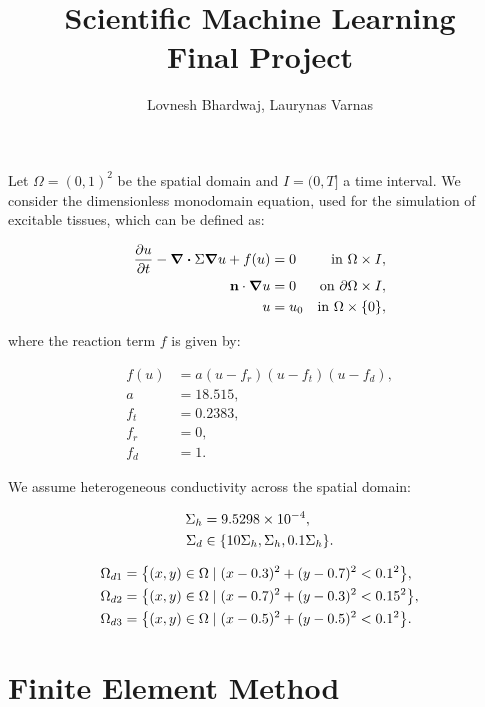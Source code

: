 \documentclass[unicode,11pt,a4paper,oneside,numbers=endperiod,openany]{article}
\title{Scientific Machine Learning \\ Final Project}
\author{Lovnesh Bhardwaj, Laurynas Varnas}
\date{}
\begin{document}
\maketitle

\noindent
Let $\Omega = (0, 1)^2$ be the spatial domain and $I = (0, T]$ a time interval.
We consider the dimensionless monodomain equation, used for the simulation of
excitable tissues, which can be defined as:

\begin{align*}
	\pdv{u}{t} - \divergence \Sigma \grad u + f(u) & = 0   & \text{in } \Omega \times I,          \\
	\mathbf{n} \cdot \grad u                       & = 0   & \text{on } \partial \Omega \times I, \\
	u                                              & = u_0 & \text{in } \Omega \times \{0\},
\end{align*}

where the reaction term $f$ is given by:

\begin{align*}
	f(u) & = a(u - f_r)(u - f_t)(u - f_d), \\
	a    & = 18.515,                       \\
	f_t  & = 0.2383,                       \\
	f_r  & = 0,                            \\
	f_d  & = 1.
\end{align*}

We assume heterogeneous conductivity across the spatial domain:

\begin{align*}
	\Sigma_h & = 9.5298 \times 10^{-4},                       \\
	\Sigma_d & \in \qty{ 10\Sigma_h, \Sigma_h, 0.1\Sigma_h }.
\end{align*}

\begin{align*}
	\Omega_{d1} & = \qty{ (x, y) \in \Omega \mid (x - 0.3)^2 + (y - 0.7)^2 < 0.1^2 },  \\
	\Omega_{d2} & = \qty{ (x, y) \in \Omega \mid (x - 0.7)^2 + (y - 0.3)^2 < 0.15^2 }, \\
	\Omega_{d3} & = \qty{ (x, y) \in \Omega \mid (x - 0.5)^2 + (y - 0.5)^2 < 0.1^2 }.
\end{align*}

\section{Finite Element Method}
\end{document}

